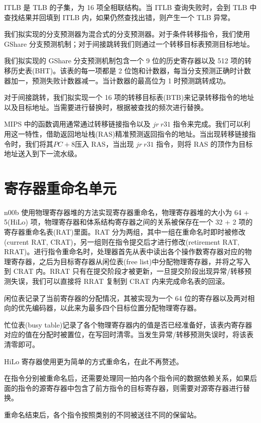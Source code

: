 \documentclass[blue,normal,cn]{elegantnote}
\begin{document}
ITLB 是 TLB 的子集，为 16 项全相联结构。当 ITLB 查询失败时，会到 TLB 中查找结果并回填到 ITLB 内，如果仍然查找出错，则产生一个 TLB 异常。

我们拟实现的分支预测器为混合式的分支预测器。对于条件转移指令，我们使用 GShare 分支预测机制；对于间接跳转我们则通过一个转移目标表预测目标地址。

我们拟实现的 GShare 分支预测机制包含一个 9 位的历史寄存器以及 512 项的转移历史表(BHT)。该表的每一项都是 2 位饱和计数器，每当分支预测正确时计数器加一，预测失败计数器减一。当计数器的最高位为 1 时预测跳转成功。

对于间接跳转，我们拟实现一个 16 项的转移目标表(BTB)来记录转移指令的地址以及目标地址。当需要进行替换时，根据被查找的频次进行替换。

MIPS 中的函数调用通常通过转移链接指令以及 $jr\ r31$ 指令来完成。我们可以利用这一特性，借助返回地址栈(RAS)精准预测返回指令的地址。当出现转移链接指令时，我们将其$PC + 8$压入 RAS，当出现 $jr\ r31$ 指令，则将 RAS 的顶作为目标地址送入到下一流水级。


\section{寄存器重命名单元}

n00b 使用物理寄存器堆的方法实现寄存器重命名，物理寄存器堆的大小为 64 + 5(HiLo) 项，物理寄存器和体系结构寄存器之间的关系被保存在一个 32 + 2 项的寄存器重命名表(RAT)里面。RAT 分为两组，其中一组在重命名时即时被修改(current RAT, CRAT)，另一组则在指令提交后才进行修改(retirement RAT, RRAT)。进行指令重命名时，处理器首先从表中读出各个操作数寄存器对应的物理寄存器，之后为目标寄存器从闲位表(free list)中分配物理寄存器，并将之写入到 CRAT 内。RRAT 只有在提交阶段才被更新，一旦提交阶段出现异常/转移预测失误，我们可以直接将 RRAT 复制到 CRAT 内来完成命名表的回滚。

闲位表记录了当前寄存器的分配情况，其被实现为一个 64 位的寄存器以及两对相向的优先编码器，以此来为最多四个目标位置分配物理寄存器。

忙位表(busy table)记录了各个物理寄存器内的值是否已经准备好，该表内寄存器对应的值在分配时被置位，在写回时清零。当发生异常/转移预测失误时，将该表清零即可。

HiLo 寄存器使用更为简单的方式重命名，在此不再赘述。

在指令分别被重命名后，还需要处理同一拍内各个指令间的数据依赖关系，如果后面的指令的源寄存器中包含了前方指令的目标寄存器，则需要对源寄存器进行替换。

重命名结束后，各个指令按照类别的不同被送往不同的保留站。
\end{document}
